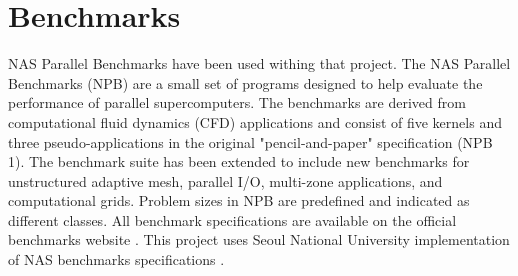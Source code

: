 \chapter{Benchmarks} \label{benchmarks}
\qquad NAS Parallel Benchmarks \cite{nas-official-website} have been used withing that project. The NAS Parallel Benchmarks (NPB) are a small set of programs designed to help evaluate the performance of parallel supercomputers. The benchmarks are derived from computational fluid dynamics (CFD) applications and consist of five kernels and three pseudo-applications in the original "pencil-and-paper" specification (NPB 1). The benchmark suite has been extended to include new benchmarks for unstructured adaptive mesh, parallel I/O, multi-zone applications, and computational grids.  Problem sizes in NPB are predefined and indicated as different classes. All benchmark specifications are available on the official benchmarks website \cite{nas-official-website}.\newline
\null\qquad This project uses Seoul National University implementation of NAS benchmarks specifications \cite{snu-nas-website}.